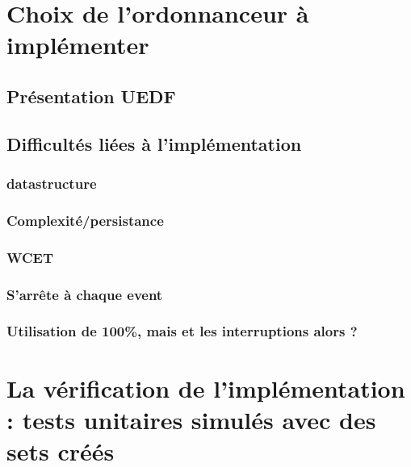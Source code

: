 

\section{Choix de l'ordonnanceur à implémenter}

\subsection{Présentation UEDF}

\subsection{Difficultés liées à l'implémentation}
	\subsubsection{datastructure}
	\subsubsection{Complexité/persistance}
	\subsubsection{WCET}
	\subsubsection{S'arrête à chaque event}
	\subsubsection{Utilisation de 100\%, mais et les interruptions alors ?}

\section{La vérification de l'implémentation : tests unitaires simulés avec des sets créés}

